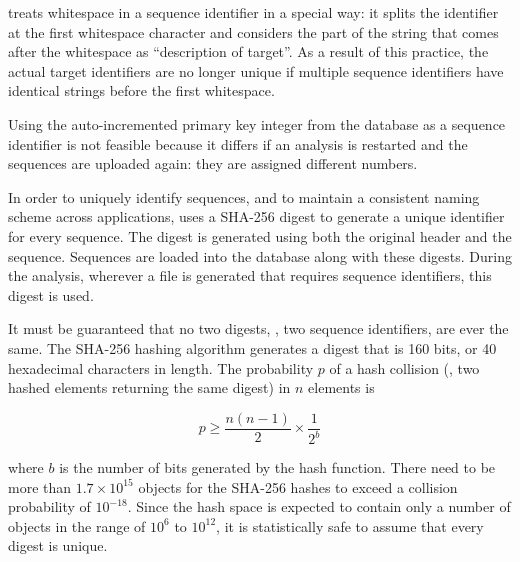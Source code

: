 \label{sec:digests}
 treats whitespace in a sequence identifier in a special way: it
splits the identifier at the first whitespace character and considers the part
of the string that comes after the whitespace as ``description of target''. As a
result of this practice, the actual target identifiers are no longer unique if
multiple sequence identifiers have identical strings before the first
whitespace.

Using the auto-incremented primary key integer from the database as a sequence
identifier is not feasible because it differs if an analysis is restarted and
the sequences are uploaded again: they are assigned different numbers. 

In order to uniquely identify sequences, and to maintain a consistent naming
scheme across applications, \pname uses a SHA-256 digest \citep{gallagher2008}
to generate a unique identifier for every sequence. The digest is generated
using both the original header and the sequence. Sequences are loaded into the
database along with these digests. During the analysis, wherever a file is
generated that requires sequence identifiers, this digest is used. 

It must be guaranteed that no two digests, \ie, two sequence identifiers, are
ever the same. The SHA-256 hashing algorithm generates a digest that is 160 bits,
or 40 hexadecimal characters in length. The probability $p$ of a hash collision
(\ie, two hashed elements returning the same digest) in $n$ elements is

\begin{equation}
p \ge \frac{n (n-1)}{2} \times \frac{1}{2^b}
\label{eq:hashcollision}
\end{equation}

where $b$ is the number of bits generated by the hash function. There need to be
more than $1.7 \times 10^{15}$ objects for the SHA-256 hashes to exceed a collision
probability of $10^{-18}$. Since the hash space is expected to contain only a
number of objects in the range of $10^6$ to $10^{12}$, it is statistically safe
to assume that every digest is unique. 


